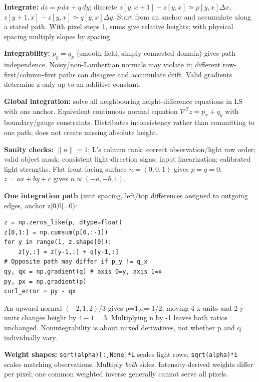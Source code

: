 \documentclass[a4paper]{article}
\newcommand{\key}[1]{\textbf{#1}}
\newcommand{\norm}[1]{\lVert #1\rVert}
\newcounter{sheet}
\newcounter{sheetcolumn}
\newlength{\colwidth}
\newcommand{\EndSheet}{\unskip\egroup\par}
\newenvironment{sheetcol}[1][7.0]{\stepcounter{sheetcolumn}
  \begin{lrbox}{\columnbox}\begin{minipage}[t]{\colwidth}\vspace{0pt}
  \fontsize{#1}{\dimexpr#1pt+0.6pt\relax}\selectfont}
  {\end{minipage}\end{lrbox}
  \typeout{CV1COL|\thesheet|\thesheetcolumn|\the\dimexpr\ht\columnbox+\dp\columnbox\relax}
  \usebox{\columnbox}\ignorespacesafterend}
\begin{document}
\begin{sheetcol}[6.4]
\key{Integrate:} \(dz=p\,dx+q\,dy\); discrete \(z[y,x+1]-z[y,x]\simeq p[y,x]\Delta x\), \(z[y+1,x]-z[y,x]\simeq q[y,x]\Delta y\). Start from an anchor and accumulate along a stated path. With pixel steps 1, sums give relative heights; with physical spacing multiply slopes by spacing.

\key{Integrability:} \(p_y=q_x\) (smooth field, simply connected domain) gives path independence. Noisy/non-Lambertian normals may violate it; different row-first/column-first paths can disagree and accumulate drift. Valid gradients determine z only up to an additive constant.

\key{Global integration:} solve all neighbouring height-difference equations in LS with one anchor. Equivalent continuous normal equation \(\nabla^2z=p_x+q_y\) with boundary/gauge constraints. Distributes inconsistency rather than committing to one path; does not create missing absolute height.

\key{Sanity checks:} \(\norm n=1\); L's column rank; correct observation/light row order; valid object mask; consistent light-direction signs; input linearization; calibrated light strengths. Flat front-facing surface \(n=(0,0,1)\) gives \(p=q=0\); \(z=ax+by+c\) gives \(n\propto(-a,-b,1)\).

\key{One integration path} (unit spacing, left/top differences assigned to outgoing edges, anchor z[0,0]=0):
\begin{lstlisting}
z = np.zeros_like(p, dtype=float)
z[0,1:] = np.cumsum(p[0,:-1])
for y in range(1, z.shape[0]):
    z[y,:] = z[y-1,:] + q[y-1,:]
# Opposite path may differ if p_y != q_x
qy, qx = np.gradient(q) # axis 0=y, axis 1=x
py, px = np.gradient(p)
curl_error = py - qx
\end{lstlisting}
An upward normal \((-2,1,2)/3\) gives p=1,q=-1/2; moving 4 x-units and 2 y-units changes height by \(4-1=3\). Multiplying n by -1 leaves both ratios unchanged. Nonintegrability is about mixed derivatives, not whether p and q individually vary.

\key{Weight shapes:} \texttt{sqrt(alpha)[:,None]*L} scales light rows; \texttt{sqrt(alpha)*i} scales matching observations. Multiply \emph{both} sides. Intensity-derived weights differ per pixel; one common weighted inverse generally cannot serve all pixels.
\end{sheetcol}\EndSheet
\end{document}
